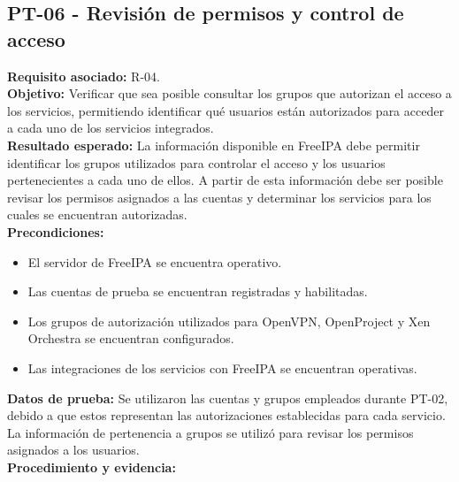 \subsection{PT-06 - Revisión de permisos y control de acceso}\label{subsec:pt06}
\textbf{Requisito asociado:} R-04.\\
\textbf{Objetivo:} Verificar que sea posible consultar los grupos que autorizan el acceso a los servicios, permitiendo identificar qué usuarios están autorizados para acceder a cada uno de los servicios integrados.\\
\textbf{Resultado esperado:} La información disponible en FreeIPA debe permitir identificar los grupos utilizados para controlar el acceso y los usuarios pertenecientes a cada uno de ellos. A partir de esta información debe ser posible revisar los permisos asignados a las cuentas y determinar los servicios para los cuales se encuentran autorizadas.\\
\textbf{Precondiciones:}
\begin{itemize}
	\item El servidor de FreeIPA se encuentra operativo.
	\item Las cuentas de prueba se encuentran registradas y habilitadas.
	\item Los grupos de autorización utilizados para OpenVPN, OpenProject y Xen Orchestra se encuentran configurados.
	\item Las integraciones de los servicios con FreeIPA se encuentran operativas.
\end{itemize}
\textbf{Datos de prueba:} Se utilizaron las cuentas y grupos empleados durante PT-02, debido a que estos representan las autorizaciones establecidas para cada servicio. La información de pertenencia a grupos se utilizó para revisar los permisos asignados a los usuarios.\\
\textbf{Procedimiento y evidencia:}
